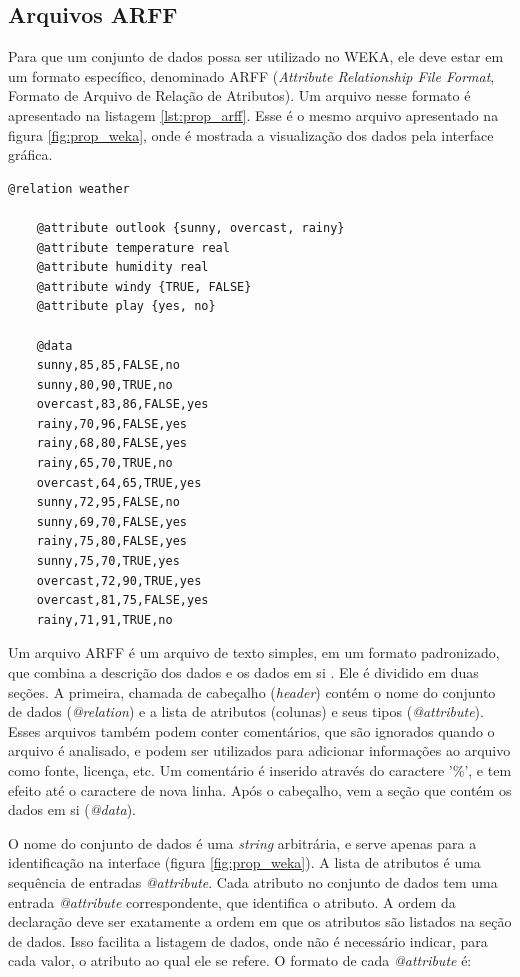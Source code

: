 \subsection{Arquivos ARFF}
\label{sec:prop_arff}

Para que um conjunto de dados possa ser utilizado no WEKA, ele deve estar em um formato específico, denominado ARFF (\emph{Attribute Relationship File Format}, Formato de Arquivo de Relação de Atributos). Um arquivo nesse formato é apresentado na listagem \ref{lst:prop_arff}. Esse é o mesmo arquivo apresentado na figura \ref{fig:prop_weka}, onde é mostrada a visualização dos dados pela interface gráfica.

\vspace{1cm}
\begin{lstlisting}[caption=Exemplo de arquivo no formato ARFF, label=lst:prop_arff]
    @relation weather

    @attribute outlook {sunny, overcast, rainy}
    @attribute temperature real
    @attribute humidity real
    @attribute windy {TRUE, FALSE}
    @attribute play {yes, no}

    @data
    sunny,85,85,FALSE,no
    sunny,80,90,TRUE,no
    overcast,83,86,FALSE,yes
    rainy,70,96,FALSE,yes
    rainy,68,80,FALSE,yes
    rainy,65,70,TRUE,no
    overcast,64,65,TRUE,yes
    sunny,72,95,FALSE,no
    sunny,69,70,FALSE,yes
    rainy,75,80,FALSE,yes
    sunny,75,70,TRUE,yes
    overcast,72,90,TRUE,yes
    overcast,81,75,FALSE,yes
    rainy,71,91,TRUE,no
\end{lstlisting}
\vspace{1cm}

Um arquivo ARFF é um arquivo de texto simples, em um formato padronizado, que combina a descrição dos dados e os dados em si \cite{Hall2009}. Ele é dividido em duas seções. A primeira, chamada de cabeçalho (\emph{header}) contém o nome do conjunto de dados (\emph{@relation}) e a lista de atributos (colunas) e seus tipos (\emph{@attribute}). Esses arquivos também podem conter comentários, que são ignorados quando o arquivo é analisado, e podem ser utilizados para adicionar informações ao arquivo como fonte, licença, etc. Um comentário é inserido através do caractere '\%', e tem efeito até o caractere de nova linha. Após o cabeçalho, vem a seção que contém os dados em si (\emph{@data}).

O nome do conjunto de dados é uma \emph{string} arbitrária, e serve apenas para a identificação na interface (figura \ref{fig:prop_weka}). A lista de atributos é uma sequência de entradas \emph{@attribute}. Cada atributo no conjunto de dados tem uma entrada \emph{@attribute} correspondente, que identifica o atributo. A ordem da declaração deve ser exatamente a ordem em que os atributos são listados na seção de dados. Isso facilita a listagem de dados, onde não é necessário indicar, para cada valor, o atributo ao qual ele se refere. O formato de cada \emph{@attribute} é:

